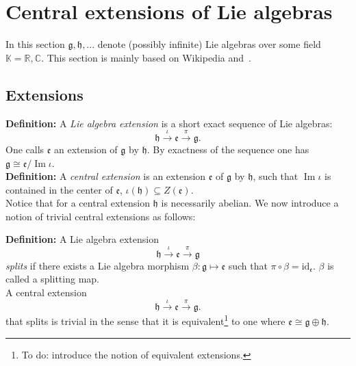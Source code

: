 \documentclass[submission, PhysLectNotes]{SciPost}
\DeclareMathOperator{\Ima}{Im}
\begin{document}
\appendix

\section{Central extensions of Lie algebras}
In this section $\mathfrak{g},\mathfrak{h},...$ denote (possibly infinite) Lie algebras over some field $\mathbb{K} = \mathbb{R}, \mathbb{C}$. This section is mainly based on Wikipedia and~\cite{Schottenloher}.
\subsection{Extensions}
{\bf Definition:} A \emph{Lie algebra extension} is a short exact sequence of Lie algebras:
\begin{equation}
	\mathfrak{h}\overset{\iota}{\rightarrow}\mathfrak{e}\overset{\pi}{\rightarrow}\mathfrak{g}.
\end{equation}
One calls $\mathfrak{e}$ an extension of $\mathfrak{g}$ by $\mathfrak{h}$. By exactness of the sequence one has $\mathfrak{g}\cong\mathfrak{e}\slash\Ima\iota$.\\

{\bf Definition:} A \emph{central extension} is an extension $\mathfrak{e}$ of $\mathfrak{g}$ by $\mathfrak{h}$, such that $\Ima \iota$ is contained in the center of $\mathfrak{e}$, $\iota(\mathfrak{h})\subseteq Z(\mathfrak{e})$.\\

Notice that for a central extension $\mathfrak{h}$ is necessarily abelian. We now introduce a notion of trivial central extensions as follows:

{\bf Definition:} A Lie algebra extension
\begin{equation}
	\mathfrak{h}\overset{\iota}{\rightarrow}\mathfrak{e}\overset{\pi}{\rightarrow}\mathfrak{g}
\end{equation}
\emph{splits} if there exists a Lie algebra morphism $\beta: \mathfrak{g}\mapsto\mathfrak{e}$ such that $\pi\circ\beta = \text{id}_{\mathfrak{e}}$. $\beta$ is called a splitting map.\\

A central extension
\begin{equation}
	\mathfrak{h}\overset{\iota}{\rightarrow}\mathfrak{e}\overset{\pi}{\rightarrow}\mathfrak{g}.
\end{equation}
that splits is trivial in the sense that it is equivalent\footnote{To do: introduce the notion of equivalent extensions.} to one where $\mathfrak{e}\cong\mathfrak{g}\oplus\mathfrak{h}$.\\
\end{document}

